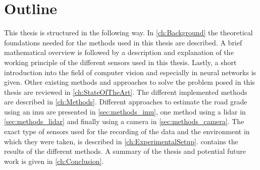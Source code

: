 \section{Outline}
This thesis is structured in the following way.
In \cref{ch:Background} the theoretical foundations needed for the methods used in this thesis are described.
A brief mathematical overview is followed by a description and explanation of the working principle of the different sensors used in this thesis.
Lastly, a short introduction into the field of computer vision and especially in neural networks is given.
Other existing methods and approaches to solve the problem posed in this thesis are reviewed in \cref{ch:StateOfTheArt}.
The different implemented methods are described in \cref{ch:Methods}.
Different approaches to estimate the road grade using an \gls{imu} are presented in \cref{sec:methods_imu}, one method using a \gls{lidar} in \cref{sec:methods_lidar} and finally using a camera in \cref{sec:methods_camera}.
The exact type of sensors used for the recording of the data and the environment in which they were taken, is described in \cref{ch:ExperimentalSetup}.
 contains the results of the different methods.
A summary of the thesis and potential future work is given in \cref{ch:Conclusion}.
